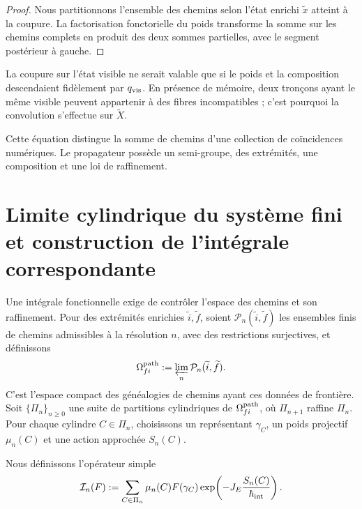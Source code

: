 \begin{proof}
Nous partitionnons l'ensemble des chemins selon l'état enrichi
\(\widetilde x\) atteint à la coupure.
La factorisation fonctorielle du poids transforme la somme sur les chemins complets
en produit des deux sommes partielles, avec le segment postérieur à
gauche.
\end{proof}

La coupure sur l'état visible ne serait valable que si le poids et la composition
descendaient fidèlement par \(q_{\rm vis}\). En présence de mémoire, deux
tronçons ayant le même visible peuvent appartenir à des fibres incompatibles ; c'est pourquoi
la convolution s'effectue sur \(\widetilde X\).

Cette équation distingue la somme de chemins d'une collection de coïncidences
numériques. Le propagateur possède un semi-groupe, des extrémités, une composition et une loi de
raffinement.

\section{Limite cylindrique du système fini et construction de l'intégrale correspondante}

Une intégrale fonctionnelle exige de contrôler l'espace des chemins et son
raffinement. Pour des extrémités enrichies \(\widetilde i,\widetilde f\), soient
\(\mathcal P_n(\widetilde i,\widetilde f)\) les ensembles finis de chemins
admissibles à la résolution \(n\), avec des restrictions surjectives, et définissons
\[
 \Omega_{fi}^{\rm path}
 :=\varprojlim_n\mathcal P_n(\widetilde i,\widetilde f).
\]
C'est l'espace compact des généalogies de chemins ayant ces données de frontière.
Soit \(\{\Pi_n\}_{n\geq0}\) une suite de partitions cylindriques de
\(\Omega_{fi}^{\rm path}\), où \(\Pi_{n+1}\) raffine \(\Pi_n\). Pour chaque
cylindre \(C\in\Pi_n\), choisissons un représentant
\(\gamma_C\), un poids projectif \(\mu_n(C)\) et une action approchée
\(S_n(C)\).

Nous définissons l'opérateur simple
\begin{equation}
 \mathcal I_n(F)
 :=\sum_{C\in\Pi_n}
   \mu_n(C)
   F(\gamma_C)
   \exp\!\left(-J_E\frac{S_n(C)}{\hbar_{\rm int}}\right).
 \label{eq:integral-cilindrica-n}
\end{equation}

